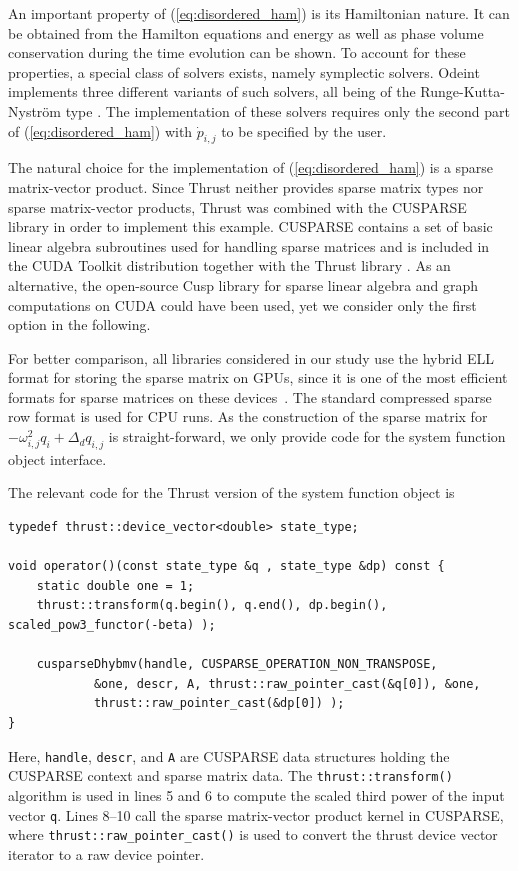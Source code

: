 \documentclass[final]{siamltex}
\newcommand{\code}[1]{\lstinline|#1|}
\newcommand{\eqref}[1]{(\ref{#1})}
\begin{document}
An important property of \eqref{eq:disordered_ham} is its Hamiltonian
nature. It can be obtained from the Hamilton equations and energy as well as phase volume conservation during the time
evolution can be shown. To account for these properties, a special class of solvers
exists, namely symplectic solvers. Odeint implements three different
variants of such solvers, all being of the Runge-Kutta-Nystr\"om
type \cite{HairerGeometricNumericalIntegration2006,Leimkuhler-Reich-04}. The
implementation of these solvers requires only the second part
of \eqref{eq:disordered_ham} with $\dot{p}_{i,j}$ to be specified by
the user.



The natural choice for the implementation of \eqref{eq:disordered_ham} is a
sparse matrix-vector product. Since Thrust neither provides sparse matrix
types nor sparse matrix-vector products, Thrust was combined with the
CUSPARSE library in order to implement this example. CUSPARSE contains a set of
basic linear algebra subroutines used for handling sparse matrices and is
included in the CUDA Toolkit distribution together with the Thrust library
\cite{NvidiaCusparseManual}. As an alternative, the open-source Cusp library
\cite{CuspRef} for sparse linear algebra and graph computations on CUDA could
have been used, yet we consider only the first option in the following.


For better comparison, all libraries considered in our study use the hybrid ELL
format for storing the sparse matrix on GPUs, since it is one of the most
efficient formats for sparse matrices on these devices~\cite{BellGarland2008}. The
standard compressed sparse row format is used for CPU runs.  As the
construction of the sparse matrix for $- \omega_{i,j}^2 q_i + \Delta_d q_{i,j}$
is straight-forward, we only provide code for the system function object interface.

The relevant code for the Thrust version of the system function object is
\begin{lstlisting}
typedef thrust::device_vector<double> state_type;

void operator()(const state_type &q , state_type &dp) const {
    static double one = 1;
    thrust::transform(q.begin(), q.end(), dp.begin(), scaled_pow3_functor(-beta) );

    cusparseDhybmv(handle, CUSPARSE_OPERATION_NON_TRANSPOSE,
            &one, descr, A, thrust::raw_pointer_cast(&q[0]), &one,
            thrust::raw_pointer_cast(&dp[0]) );
}
\end{lstlisting}
Here, \code{handle}, \code{descr}, and \code{A} are CUSPARSE data structures
holding the CUSPARSE context and sparse matrix data. The
\code{thrust::transform()} algorithm is used in lines 5 and 6 to compute the
scaled third power of the input vector \code{q}. Lines 8--10 call the sparse
matrix-vector product kernel in CUSPARSE, where
\code{thrust::raw_pointer_cast()} is used to convert the thrust device vector
iterator to a raw device pointer.
\end{document}
